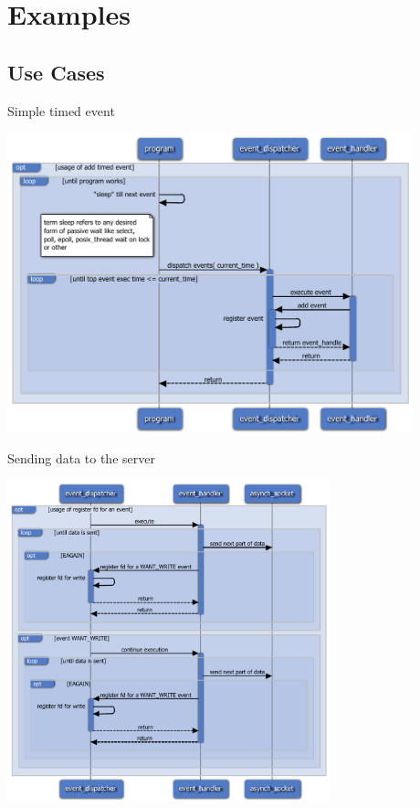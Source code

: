 \documentclass{beamer}
\begin{document}
\section{Examples}

\subsection{Use Cases}

\begin{frame}{Simple timed event}
    \centerline{\includegraphics[width=0.88\textwidth]{design-intro.slides/evtd_details_time.pdf}}
\end{frame}

\begin{frame}{Sending data to the server}
    \centerline{\includegraphics[width=0.70\textwidth]{design-intro.slides/evtd_details_send.pdf}}
\end{frame}
\end{document}
